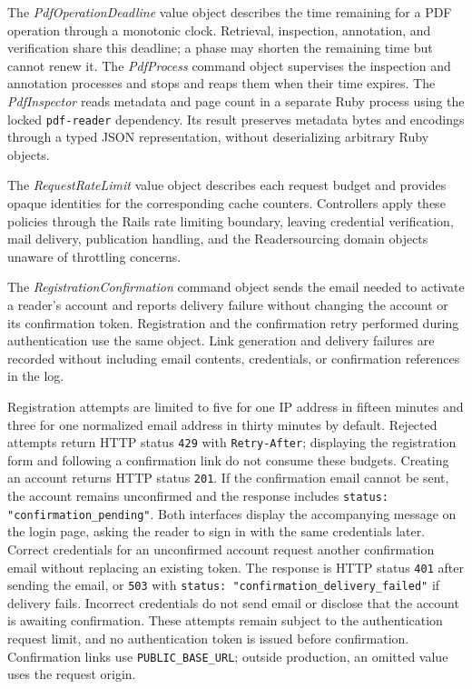 \documentclass[a4paper, english]{article}
\begin{document}
The \emph{PdfOperationDeadline} value object describes the time remaining for a PDF operation through a monotonic clock. Retrieval, inspection, annotation, and verification share this deadline; a phase may shorten the remaining time but cannot renew it. The \emph{PdfProcess} command object supervises the inspection and annotation processes and stops and reaps them when their time expires. The \emph{PdfInspector} reads metadata and page count in a separate Ruby process using the locked \verb|pdf-reader| dependency. Its result preserves metadata bytes and encodings through a typed JSON representation, without deserializing arbitrary Ruby objects.

The \emph{RequestRateLimit} value object describes each request budget and provides opaque identities for the corresponding cache counters. Controllers apply these policies through the Rails rate limiting boundary, leaving credential verification, mail delivery, publication handling, and the Readersourcing domain objects unaware of throttling concerns.

The \emph{RegistrationConfirmation} command object sends the email needed to activate a reader's account and reports delivery failure without changing the account or its confirmation token. Registration and the confirmation retry performed during authentication use the same object. Link generation and delivery failures are recorded without including email contents, credentials, or confirmation references in the log.

Registration attempts are limited to five for one IP address in fifteen minutes and three for one normalized email address in thirty minutes by default. Rejected attempts return HTTP status \verb|429| with \verb|Retry-After|; displaying the registration form and following a confirmation link do not consume these budgets. Creating an account returns HTTP status \verb|201|. If the confirmation email cannot be sent, the account remains unconfirmed and the response includes \verb|status: "confirmation_pending"|. Both interfaces display the accompanying message on the login page, asking the reader to sign in with the same credentials later. Correct credentials for an unconfirmed account request another confirmation email without replacing an existing token. The response is HTTP status \verb|401| after sending the email, or \verb|503| with \verb|status: "confirmation_delivery_failed"| if delivery fails. Incorrect credentials do not send email or disclose that the account is awaiting confirmation. These attempts remain subject to the authentication request limit, and no authentication token is issued before confirmation. Confirmation links use \verb|PUBLIC_BASE_URL|; outside production, an omitted value uses the request origin.
\end{document}
